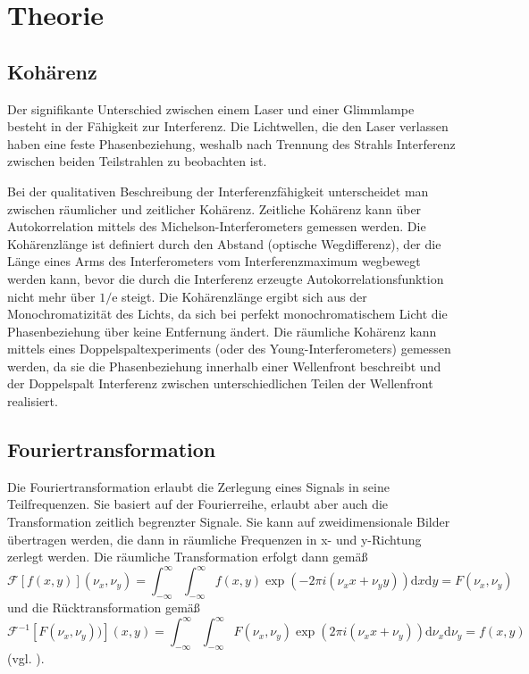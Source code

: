 \documentclass[
	a4paper,
	12pt,
	pagesize,
	ngerman
]{scrartcl}
\begin{document}
  \section{Theorie}


	\subsection{Kohärenz} %
	Der signifikante Unterschied zwischen einem Laser und einer Glimmlampe besteht in der Fähigkeit zur Interferenz.
	Die Lichtwellen, die den Laser verlassen haben eine feste Phasenbeziehung, weshalb nach Trennung des Strahls Interferenz zwischen beiden Teilstrahlen zu beobachten ist.

	Bei der qualitativen Beschreibung der Interferenzfähigkeit unterscheidet man zwischen räumlicher und zeitlicher Kohärenz.
	Zeitliche Kohärenz kann über Autokorrelation mittels des Michelson-Interferometers gemessen werden.
	Die Kohärenzlänge ist definiert durch den Abstand (optische Wegdifferenz), der die Länge eines Arms des Interferometers vom Interferenzmaximum wegbewegt werden kann, bevor die durch die Interferenz erzeugte Autokorrelationsfunktion nicht mehr über $1/\text{e}$ steigt.
	Die Kohärenzlänge ergibt sich aus der Monochromatizität des Lichts, da sich bei perfekt monochromatischem Licht die Phasenbeziehung über keine Entfernung ändert.
	Die räumliche Kohärenz kann mittels eines Doppelspaltexperiments (oder des Young-Interferometers) gemessen werden, da sie die Phasenbeziehung innerhalb einer Wellenfront beschreibt und der Doppelspalt Interferenz zwischen unterschiedlichen Teilen der Wellenfront realisiert.

	\subsection{Fouriertransformation}
	Die Fouriertransformation erlaubt die Zerlegung eines Signals in seine Teilfrequenzen.
	Sie basiert auf der Fourierreihe, erlaubt aber auch die Transformation zeitlich begrenzter Signale.
	Sie kann auf zweidimensionale Bilder übertragen werden, die dann in räumliche Frequenzen in x- und y-Richtung zerlegt werden.
	Die räumliche Transformation erfolgt dann gemäß
	\begin{equation}
		\mathcal{F}[f(x,y)](\nu_x, \nu_y) = \int _{-\infty}^{\infty} \int^{\infty}_{-\infty} f(x,y) \exp (-2\pi i (\nu_x x + \nu_y y)) \mathrm{d} x \mathrm{d} y = F (\nu_x , \nu_y)
	\end{equation}
	und die Rücktransformation gemäß
	\begin{equation}
		\mathcal{F}^{-1}[F (\nu_x , \nu_y))](x, y) = \int _{-\infty}^{\infty} \int^{\infty}_{-\infty} F(\nu_x , \nu_y) \exp (2\pi i (\nu_x x + \nu_y )) \mathrm{d} \nu_x \mathrm{d} \nu_y = f (x , y)
	\end{equation}
	(vgl. \cite{Anleitung}).
\end{document}
